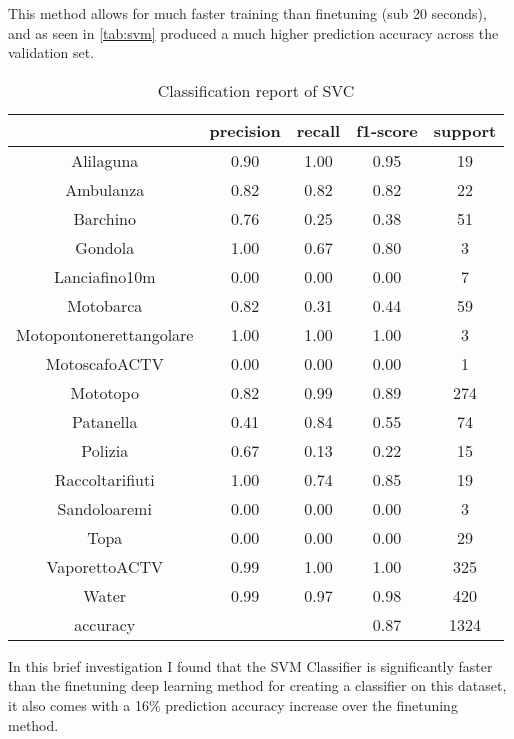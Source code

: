 \documentclass[sigconf]{acmart}
\begin{document}
This method allows for much faster training than finetuning (sub 20 seconds), and as seen in \autoref{tab:svm} produced a much higher prediction accuracy across the validation set.

\begin{table}[h!]
    \begin{tabular}{ |c c c c c| } 
     \hline
    & precision & recall & f1-score  & support \\
    \hline 
    Alilaguna & 0.90 & 1.00 & 0.95 & 19 \\
    Ambulanza & 0.82 & 0.82 & 0.82 & 22 \\
    Barchino & 0.76 & 0.25 & 0.38 & 51 \\ 
    Gondola & 1.00 & 0.67 & 0.80 & 3 \\ 
    Lanciafino10m & 0.00 & 0.00 & 0.00 & 7 \\
    Motobarca & 0.82 & 0.31 & 0.44 & 59 \\
Motopontonerettangolare & 1.00 & 1.00 & 1.00 & 3 \\
    MotoscafoACTV & 0.00 & 0.00 & 0.00 & 1 \\ 
    Mototopo & 0.82 & 0.99 & 0.89 & 274 \\  
    Patanella & 0.41 & 0.84 & 0.55 & 74 \\
    Polizia & 0.67 & 0.13 & 0.22 & 15 \\
    Raccoltarifiuti & 1.00 & 0.74 & 0.85 & 19 \\
    Sandoloaremi & 0.00 & 0.00 & 0.00 & 3 \\ 
    Topa & 0.00 & 0.00 & 0.00 & 29 \\ 
    VaporettoACTV & 0.99 & 1.00 & 1.00 & 325 \\
    Water     & 0.99 & 0.97  & 0.98 & 420 \\
        \hline
    accuracy  &     &   & 0.87 & 1324 \\
               \hline
    \end{tabular}
    \caption{Classification report of SVC}
    \label{tab:svm}
\end{table}
        
In this brief investigation I found that the SVM Classifier is significantly faster than the finetuning deep learning method for creating a classifier on this dataset, it also comes with a 16\% prediction accuracy increase over the finetuning method.
\end{document}
